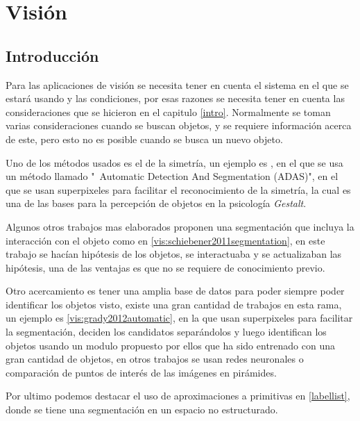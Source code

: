    \chapter{Visión}
    
    \section{Introducción}

Para las aplicaciones de visión se necesita tener en cuenta el sistema en el que se estará usando y las condiciones, por esas razones se necesita tener en cuenta las consideraciones que se hicieron en el capitulo \ref{intro}. Normalmente se toman varias consideraciones cuando se buscan objetos, y se requiere información acerca de este, pero esto no es posible cuando se busca un nuevo objeto.

Uno de los métodos usados es el de la simetría, un ejemplo es \cite{vis:kootstra2010fast}, en el que se usa un método llamado "\ Automatic Detection And Segmentation (ADAS)", en el que se usan superpixeles para facilitar el reconocimiento de la simetría, la cual es una de las bases para la percepción de objetos en la psicología \textit{Gestalt}.

Algunos otros trabajos mas elaborados proponen una segmentación que incluya la interacción con el objeto como en \cref{vis:schiebener2011segmentation}, en este trabajo se hacían hipótesis de los objetos, se interactuaba y se actualizaban las hipótesis, una de las ventajas es que no se requiere de conocimiento previo.

Otro acercamiento es tener una amplia base de datos para poder siempre poder identificar los objetos visto, existe una gran cantidad de trabajos en esta rama, un ejemplo es \cref{vis:grady2012automatic}, en la que usan superpixeles para facilitar la segmentación, deciden los candidatos separándolos y luego identifican los objetos usando un modulo propuesto por ellos que ha sido entrenado con una gran cantidad de objetos, en otros trabajos se usan redes neuronales o comparación de puntos de interés de las imágenes en pirámides.

Por ultimo podemos destacar el uso de aproximaciones a primitivas en \ref{labellist}, donde se tiene una segmentación en un espacio no estructurado.

    
